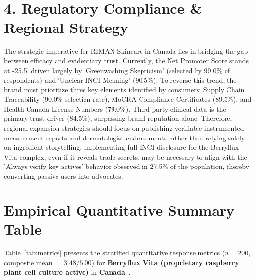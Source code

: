 \documentclass[10pt,twocolumn,a4paper]{article}
\begin{document}
\section{4. Regulatory Compliance \& Regional Strategy}
The strategic imperative for RIMAN Skincare in Canada lies in bridging the gap between efficacy and evidentiary trust. Currently, the Net Promoter Score stands at -25.5, driven largely by 'Greenwashing Skepticism' (selected by 99.0\% of respondents) and 'Unclear INCI Meaning' (90.5\%). To reverse this trend, the brand must prioritize three key elements identified by consumers: Supply Chain Traceability (90.0\% selection rate), MoCRA Compliance Certificates (89.5\%), and Health Canada License Numbers (79.0\%). Third-party clinical data is the primary trust driver (84.5\%), surpassing brand reputation alone. Therefore, regional expansion strategies should focus on publishing verifiable instrumented measurement reports and dermatologist endorsements rather than relying solely on ingredient storytelling. Implementing full INCI disclosure for the Berryflux Vita complex, even if it reveals trade secrets, may be necessary to align with the 'Always verify key actives' behavior observed in 27.5\% of the population, thereby converting passive users into advocates.


\section{Empirical Quantitative Summary Table}
Table~\ref{tab:metrics} presents the stratified quantitative response metrics ($n = 200$, composite mean $= 3.48/5.00$) for \textbf{Berryflux Vita (proprietary raspberry plant cell culture active)} in \textbf{Canada}~\cite{ref_kaggle_doi,ref_hf_doi}.
\end{document}
